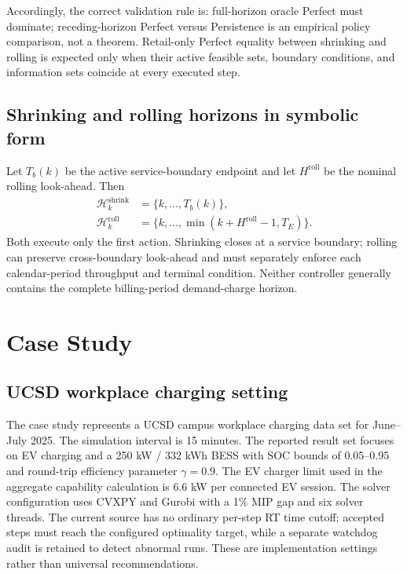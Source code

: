 \documentclass[final,5p,times]{elsarticle}
\newcommand{\calH}{\mathcal{H}}
\begin{document}
Accordingly, the correct validation rule is: full-horizon oracle Perfect must dominate; receding-horizon Perfect versus Persistence is an empirical policy comparison, not a theorem. Retail-only Perfect equality between shrinking and rolling is expected only when their active feasible sets, boundary conditions, and information sets coincide at every executed step.

\subsection{Shrinking and rolling horizons in symbolic form}
Let $T_b(k)$ be the active service-boundary endpoint and let $H^{\mathrm{roll}}$ be the nominal rolling look-ahead. Then
\begin{align}
\calH_k^{\mathrm{shrink}}&=\{k,\ldots,T_b(k)\},\label{eq:shrink_horizon}\\
\calH_k^{\mathrm{roll}}&=\{k,\ldots,\min(k+H^{\mathrm{roll}}-1,T_E)\}.\label{eq:roll_horizon}
\end{align}
Both execute only the first action. Shrinking closes at a service boundary; rolling can preserve cross-boundary look-ahead and must separately enforce each calendar-period throughput and terminal condition. Neither controller generally contains the complete billing-period demand-charge horizon.

\section{Case Study}
\label{sec:case_study}

\subsection{UCSD workplace charging setting}
The case study represents a UCSD campus workplace charging data set for June--July 2025. The simulation interval is 15 minutes. The reported result set focuses on EV charging and a 250 kW / 332 kWh BESS with SOC bounds of 0.05--0.95 and round-trip efficiency parameter $\gamma=0.9$. The EV charger limit used in the aggregate capability calculation is 6.6 kW per connected EV session. The solver configuration uses CVXPY and Gurobi with a 1\% MIP gap and six solver threads. The current source has no ordinary per-step RT time cutoff; accepted steps must reach the configured optimality target, while a separate watchdog audit is retained to detect abnormal runs. These are implementation settings rather than universal recommendations.
\end{document}
